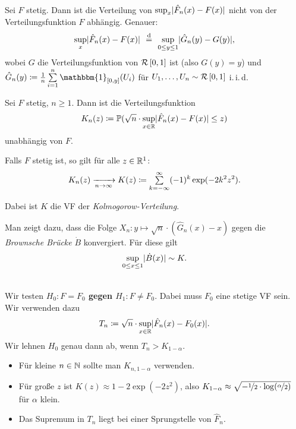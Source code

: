 \documentclass{cheat-sheet}
\renewcommand{\P}{\mathbb{P}} %
\newcommand{\ind}{\mathbbm{1}} %
\DeclareMathOperator*{\eqqd}{\stackrel{d}{=}} %
\newcommand{\iid}{i.\,i.\,d.} %
\newcommand{\Uniform}{\mathcal{R}} %
\newcommand{\testh}[1]{\textcolor{TestColor}{\textbf{#1}}}
\begin{document}
\begin{lem}
  Sei $F$ stetig.
  Dann ist die Verteilung von $\sup_x \lvert\hat{F}_n(x) - F(x)\rvert$ nicht von der Verteilungsfunktion $F$ abhängig.
  Genauer:
  \[ \sup_x \abs{\hat{F}_n(x) - F(x)} \enspace\eqqd\enspace \sup_{0 \leq y \leq 1} \abs{\hat{G}_n(y) - G(y)}, \]
  wobei $G$ die Verteilungsfunktion von $\Uniform \cinterval{0}{1}$ ist (also $G(y) = y$) und $\hat{G}_n(y) \coloneqq \tfrac{1}{n} \sum_{i=1}^n \ind_{\cinterval{0}{y}}(U_i)$ für $U_1, \ldots, U_n \sim \Uniform \cinterval{0}{1}$ \iid{}
\end{lem}


\begin{kor}
  Sei $F$ stetig, $n \geq 1$.
  Dann ist die Verteilungsfunktion
  \[ K_n(z) \coloneqq \P(\sqrt{n} \cdot \sup_{x \in \R} \abs{\hat{F}_n(x) - F(x)} \leq z) \]
  unabhängig von $F$.
\end{kor}

\begin{satz}
  Falls $F$ stetig ist, so gilt für alle $z \in \mathbb{R}^1$:
  \[ K_n(z) \xra[n \to \infty]{} K(z) \coloneqq \sum_{k = - \infty}^\infty (-1)^k \exp(-2 k^2 z^2). \]
\end{satz}

\begin{defn}
  Dabei ist $K$ die VF der \emph{Kolmogorow-Verteilung}.
\end{defn}

\begin{bem}
  Man zeigt dazu, dass die Folge $X_n : y \mapsto \sqrt{n} \cdot (\hat{G}_n(x) - x)$ gegen die \emph{Brownsche Brücke} $\dot{B}$ konvergiert.
  Für diese gilt
  \[ \sup_{0 \leq x \leq 1} \lvert\dot{B}(x)\rvert \sim K. \]
\end{bem}

\begin{entscheidungsregel} \mbox{}\\
  Wir testen \testh{$H_0 : F = F_0$ gegen $H_1 : F \neq F_0$}.
  Dabei muss $F_0$ eine stetige VF sein.
  Wir verwenden dazu
  \[ T_n \coloneqq \sqrt{n} \cdot \sup_{x \in \mathbb{R}} \lvert\hat{F}_n(x) - F_0(x)\rvert. \]
  Wir lehnen $H_0$ genau dann ab, wenn $T_n > K_{1-\alpha}$.
\end{entscheidungsregel}

\begin{bemn}
  \begin{itemize}
    \item Für kleine $n \in \mathbb{N}$ sollte man $K_{n,1-\alpha}$ verwenden.
    \item Für große $z$ ist $K(z) \approx 1 - 2 \exp(-2 z^2)$, also $K_{1-\alpha} \approx \sqrt{- \nicefrac{1}{2} \cdot \log(\nicefrac{\alpha}{2})}$ für $\alpha$ klein.
    \item Das Supremum in $T_n$ liegt bei einer Sprungstelle von $\hat{F}_n$.
  \end{itemize}
\end{bemn}
\end{document}
